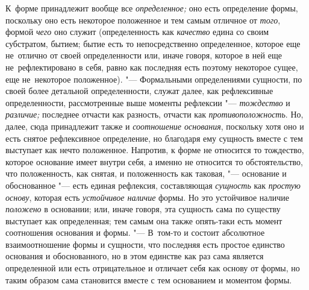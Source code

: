 К~форме принадлежит вообще все {\em определенное;} оно есть определение формы,
поскольку оно есть некоторое положенное и тем самым отличное от {\em того},
формой {\em чего} оно служит (определенность как {\em качество} едина со своим
субстратом, бытием; бытие есть то непосредственно определенное, которое еще
не~отлично от своей определенности или, иначе говоря, которое в ней еще
не~рефлектировано в себя, равно как последняя есть поэтому некоторое сущее, еще
не~некоторое положенное). "--- Формальными определениями сущности, по своей
более детальной определенности, служат далее, как рефлексивные определенности,
рассмотренные выше моменты рефлексии "--- {\em тождество} и {\em различие;}
последнее отчасти как разность, отчасти как {\em противоположность}. Но, далее,
сюда принадлежит также и {\em соотношение основания}, поскольку хотя оно и есть
снятое рефлексивное определение, но благодаря ему сущность вместе с тем
выступает как нечто положенное. Напротив, к форме не относится то тождество,
которое основание имеет внутри себя, а именно не относится то обстоятельство,
что положенность, как снятая, и положенность как таковая, "--- основание и
обоснованное "--- есть единая рефлексия, составляющая {\em сущность} как
{\em простую основу}, которая есть {\em устойчивое наличие} формы. Но это
устойчивое наличие {\em положено} в основании; или, иначе говоря, эта сущность
сама по существу выступает как определенная; тем самым она также опять-таки
есть момент соотношения основания и формы. "--- В~том-то и состоит абсолютное
взаимоотношение формы и сущности, что последняя есть простое единство основания
и обоснованного, но в этом единстве как раз сама является определенной или есть
отрицательное и отличает себя как основу от формы, но таким образом сама
становится вместе с тем основанием и моментом формы.

